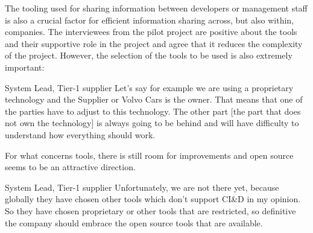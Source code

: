 %
%
%
%

 The tooling used for sharing information between developers or management staff is also a crucial factor for efficient information sharing across, but also within, companies. The interviewees from the pilot project are positive about the tools and their supportive role in the project and agree that it reduces the complexity of the project. However, the selection of the tools to be used is also extremely important:

\begin{aquote}{System Lead, Tier-1 supplier}
Let's say for example we are using a proprietary technology and the Supplier or Volvo Cars is the owner. That means that one of the parties have to adjust to this technology. The other part [the part that does not own the technology] is always going to be behind and will have difficulty to understand how everything should work.
\end{aquote} 

For what concerns tools, there is still room for improvements and open source seems to be an attractive direction.

\begin{aquote}{System Lead, Tier-1 supplier}
Unfortunately, we are not there yet, because globally they have chosen other tools which don't support CI\&D in my opinion. So they have chosen proprietary or other tools that are restricted, so definitive the company should embrace the open source tools that are available.
\end{aquote}

%
%
%
%

